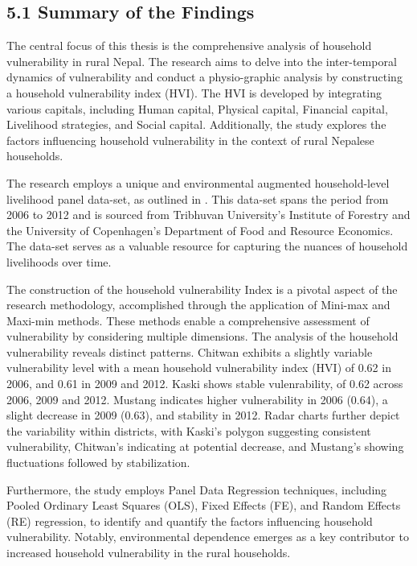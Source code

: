 \documentclass[12pt, a4paper]{article}
\begin{document}
\subsection*{5.1 Summary of the Findings}
\renewcommand{\thepage}{\arabic{page}}
The central focus of this thesis is the comprehensive analysis of household vulnerability in rural Nepal. The research aims to delve into the inter-temporal dynamics of vulnerability and conduct a physio-graphic analysis by constructing a household vulnerability index (HVI). The HVI is developed by integrating various capitals, including Human capital, Physical capital, Financial capital, Livelihood strategies, and Social capital. Additionally, the study explores the factors influencing household vulnerability in the context of rural Nepalese households.

The research employs a unique and environmental augmented household-level livelihood panel data-set, as outlined in \citep{walelign2022unique}. This data-set spans the period from 2006 to 2012 and is sourced from Tribhuvan University’s Institute of Forestry and the University of Copenhagen’s Department of Food and Resource Economics. The data-set serves as a valuable resource for capturing the nuances of household livelihoods over time. 

The construction of the household vulnerability Index is a pivotal aspect of the research methodology, accomplished through the application of Mini-max and Maxi-min methods. These methods enable a comprehensive assessment of vulnerability by considering multiple dimensions. The analysis of the household vulnerability reveals distinct patterns. Chitwan exhibits a slightly variable vulnerability level with a mean household vulnerability index (HVI) of 0.62 in 2006, and 0.61 in 2009 and 2012. Kaski shows stable vulenrability, of 0.62 across 2006, 2009 and 2012. Mustang indicates higher vulnerability in 2006 (0.64), a slight decrease in 2009 (0.63), and stability in 2012.  Radar charts further depict the variability within districts, with Kaski's polygon suggesting consistent vulnerability, Chitwan's indicating at potential decrease, and Mustang's showing fluctuations followed by stabilization.  

Furthermore, the study employs Panel Data Regression techniques, including Pooled Ordinary Least Squares (OLS), Fixed Effects (FE), and Random Effects (RE) regression, to identify and quantify the factors influencing household vulnerability. Notably, environmental dependence emerges as a key contributor to increased household vulnerability in the rural households.
\end{document}

